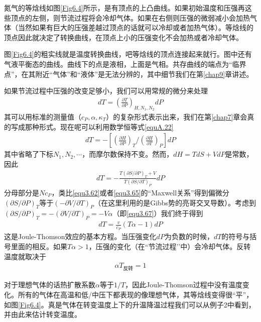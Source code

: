 氮气的等焓线如图\ref{Fig6.4}所示，是有顶点的上凸曲线。如果初始温度和压强再这些顶点的左侧，则节流过程将会冷却气体。如果在右侧则压强的微弱减小会加热气体（当然如果有巨大的压强差越过顶点的话就可以冷却或者加热气体）。等焓线的顶点因此就决定了转换曲线，在顶点上小的压强变化不会加热或者冷却气体。%

图\ref{Fig6.4}的粗实线就是温度转换曲线，吧等焓线的顶点连接起来就行。图中还有气液平衡态的曲线。曲线下的点是液相，上面是气相。共存曲线的端点为``临界点''，在其附近``气体''和``液体''是无法分辨的，其中细节我们在第\ref{chap9}章讲述。

如果节流过程中压强的改变足够小，我们可以用常规的微分来处理
\begin{align}\label{equ6.38}
dT=\left(\frac{\partial T}{\partial P}\right)_{H, N_1, N_2}dP
\end{align}
其可以用标准的测量值（$c_P, \alpha, \kappa_T$）的复杂形式表示出来，我们在第\ref{chap7}章会真的写成那种形式。现在呢可以利用数学恒等式\eqref{equA.22}
\begin{align}\label{equ6.39}
dT=-\left[\left(\frac{\partial H}{\partial P}\right)_T/\left(\frac{\partial H}{\partial T}\right)_P\right]dP
\end{align}
其中省略了下标$N_1, N_2,\cdots$，而摩尔数保持不变。然而，$dH=TdS+VdP$是常数，因此
\begin{align}\label{equ6.40}
dT=-\frac{T(\partial S/\partial P)_T+V}{T(\partial S/\partial T)_P}dP
\end{align}
分母部分是$Nc_P$，类比\eqref{equ3.62}或者\eqref{equ3.65}的``Maxwell关系''得到偏微分$(\partial S/\partial P)_T$等于$(-\partial V/\partial T)_P$（在这里利用的是Gibbs势的亮哥交叉导数）。考虑到$(\partial S/\partial P)_T=-(\partial V/\partial T)_P=-V\alpha$（即\eqref{equ3.67}）我们终于得到
\begin{align}\label{equ6.41}
dT=\frac{v}{c_P}(T\alpha-1)dP
\end{align}
这是Joule-Thomson效应的基本方程。当压强变化$dP$为负数的时候，$dT$的符号与括号里面的相反。如果$T\alpha>1$，压强的变化（在``节流过程’’中）会冷却气体。反转温度就取决于
\begin{align}\label{equ6.42}
\alpha T_{\text{反转}} = 1
\end{align}

对于理想气体的话热扩散系数$\alpha$等于$1/T$，因此Joule-Thomson过程中没有温度变化。所有的气体在高温和低/中压下都表现的像理想气体，其等焓线变得很``平''，如图\ref{Fig6.4}。真是气体在转变温度上下的升温降温过程我们可以从例子2中看到，并由此来估计转变温度。

